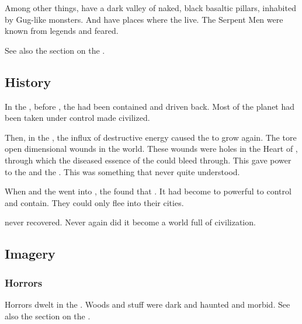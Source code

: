 Among other things, have a dark valley of naked, black basaltic pillars, inhabited by Gug-like monsters. 
And have places where the \quiljaaran live. 
The Serpent Men were known from legends and feared. 

See also the section on the .









\subsection{History}
In the , before \Sethicus, the \wylde had been contained and driven back.
Most of the planet had been taken under control made civilized. 

Then, in the , the influx of destructive \xs energy caused the \wylde to grow again.
The \dragons tore open dimensional wounds in the world. 
These wounds were holes in the Heart of \Miith, through which the diseased essence of the  could bleed through. 
This gave power to the  and the .
This was something that \Sethicus never quite understood.

When \Sethicus and the \dragons went into , the \ophidians found that . 
It had become to powerful to control and contain.
They could only flee into their cities. 

\Miith never recovered. 
Never again did it become a world full of civilization. 









\subsection{Imagery}





\subsubsection{Horrors}
Horrors dwelt in the \wylde. 
Woods and stuff were dark and haunted and morbid. 
See also the section on the . 

